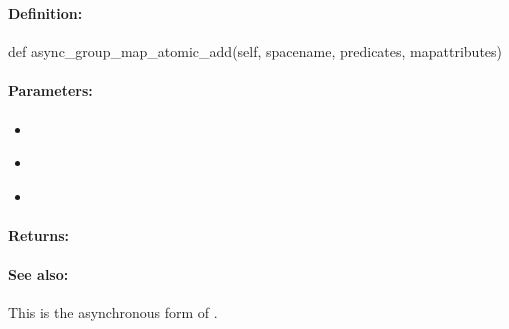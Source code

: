 \pagebreak
\subsubsection{}
\label{api:python:async_group_map_atomic_add}


\paragraph{Definition:}
\begin{pythoncode}
def async_group_map_atomic_add(self, spacename, predicates, mapattributes)
\end{pythoncode}

\paragraph{Parameters:}
\begin{itemize}[noitemsep]
\item {}\\

\item {}\\

\item {}\\

\end{itemize}

\paragraph{Returns:}


\paragraph{See also:}  This is the asynchronous form of .

\pagebreak
\subsubsection{}
\label{api:python:map_atomic_sub}


